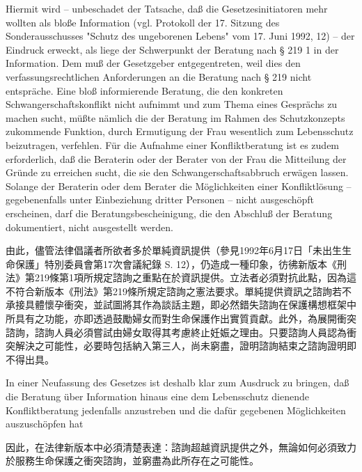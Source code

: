 \documentclass[12pt]{article}
\begin{document}
\begin{sourcepara}[title={原文E.182}]
Hiermit wird -- unbeschadet der Tatsache, daß die Gesetzesinitiatoren mehr wollten als bloße Information (vgl. Protokoll der 17. Sitzung des Sonderausschusses "Schutz des ungeborenen Lebens" vom 17. Juni 1992, \abbrS{} 12) -- der Eindruck erweckt, als liege der Schwerpunkt der Beratung nach § 219 \abbrAbs{} 1 \abbrStGB{} \abbrNF{} in der Information. Dem muß der Gesetzgeber entgegentreten, weil dies den verfassungsrechtlichen Anforderungen an die Beratung nach § 219 \abbrStGB{} \abbrNF{} nicht entspräche. Eine bloß informierende Beratung, die den konkreten Schwangerschaftskonflikt nicht aufnimmt und zum Thema eines Gesprächs zu machen sucht, müßte nämlich die der Beratung im Rahmen des Schutzkonzepts zukommende Funktion, durch Ermutigung der Frau wesentlich zum Lebensschutz beizutragen, verfehlen. Für die Aufnahme einer Konfliktberatung ist es zudem erforderlich, daß die Beraterin oder der Berater von der Frau die Mitteilung der Gründe zu erreichen sucht, die sie den Schwangerschaftsabbruch erwägen lassen. Solange der Beraterin oder dem Berater die Möglichkeiten einer Konfliktlösung -- gegebenenfalls unter Einbeziehung dritter Personen -- nicht ausgeschöpft erscheinen, darf die Beratungsbescheinigung, die den Abschluß der Beratung dokumentiert, nicht ausgestellt werden.
\end{sourcepara}
\begin{transpara}
由此，儘管法律倡議者所欲者多於單純資訊提供（參見1992年6月17日「未出生生命保護」特別委員會第17次會議紀錄 S. 12），仍造成一種印象，彷彿新版本《刑法》第219條第1項所規定諮詢之重點在於資訊提供。立法者必須對抗此點，因為這不符合新版本《刑法》第219條所規定諮詢之憲法要求。單純提供資訊之諮詢若不承接具體懷孕衝突，並試圖將其作為談話主題，即必然錯失諮詢在保護構想框架中所具有之功能，亦即透過鼓勵婦女而對生命保護作出實質貢獻。此外，為展開衝突諮詢，諮詢人員必須嘗試由婦女取得其考慮終止妊娠之理由。只要諮詢人員認為衝突解決之可能性，必要時包括納入第三人，尚未窮盡，證明諮詢結束之諮詢證明即不得出具。
\end{transpara}

\begin{sourcepara}[title={原文E.183}]
In einer Neufassung des Gesetzes ist deshalb klar zum Ausdruck zu bringen, daß die Beratung über Information hinaus eine dem Lebensschutz dienende Konfliktberatung jedenfalls anzustreben und die dafür gegebenen Möglichkeiten auszuschöpfen hat
\end{sourcepara}
\begin{transpara}
因此，在法律新版本中必須清楚表達：諮詢超越資訊提供之外，無論如何必須致力於服務生命保護之衝突諮詢，並窮盡為此所存在之可能性。
\end{transpara}
\end{document}

